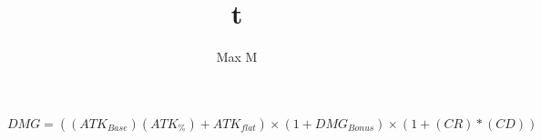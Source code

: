 \documentclass[a4paper]{article}
\title{t}
\author{Max M}
\begin{document}
\begin{equation}
	DMG = \left((ATK_{Base})(ATK_{\%}) + ATK_{flat}\right)\times (1 + DMG_{Bonus}) \times (1 + (CR)*(CD)) 
\end{equation}
\end{document}
